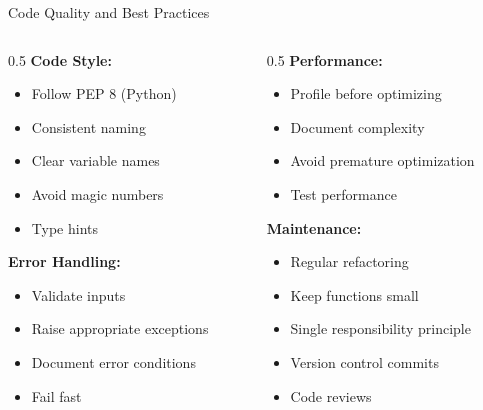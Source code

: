 \documentclass[aspectratio=169,xcolor=dvipsnames]{beamer}
\begin{document}
\begin{frame}{Code Quality and Best Practices}
  \begin{columns}
    \begin{column}{0.5\textwidth}
      \textbf{Code Style:}
      \begin{itemize}
        \item Follow PEP 8 (Python)
        \item Consistent naming
        \item Clear variable names
        \item Avoid magic numbers
        \item Type hints
      \end{itemize}

      \vspace{0.2cm}
      \textbf{Error Handling:}
      \begin{itemize}
        \item Validate inputs
        \item Raise appropriate exceptions
        \item Document error conditions
        \item Fail fast
      \end{itemize}
    \end{column}

    \begin{column}{0.5\textwidth}
      \textbf{Performance:}
      \begin{itemize}
        \item Profile before optimizing
        \item Document complexity
        \item Avoid premature optimization
        \item Test performance
      \end{itemize}

      \vspace{0.2cm}
      \textbf{Maintenance:}
      \begin{itemize}
        \item Regular refactoring
        \item Keep functions small
        \item Single responsibility principle
        \item Version control commits
        \item Code reviews
      \end{itemize}
    \end{column}
  \end{columns}
\end{frame}
\end{document}
